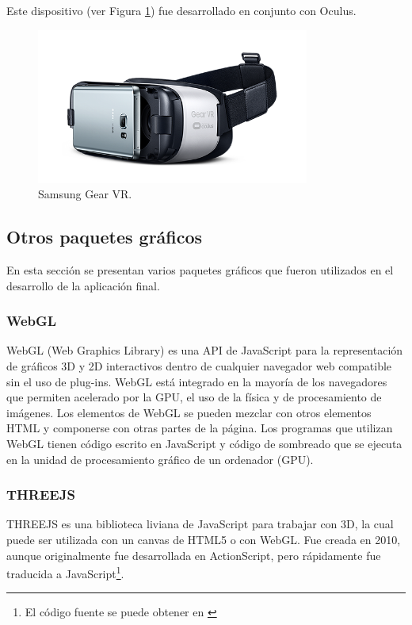 \documentclass[12pt]{article}
\begin{document}
Este dispositivo (ver Figura \ref{sgvr}) fue desarrollado en conjunto con Oculus\cite{samsungvr}.
\begin{figure}[h!]
\includegraphics[width=0.8\textwidth,center]{samsungvr.png}
\caption{Samsung Gear VR.}
\label{sgvr}
\end{figure}

\subsection{Otros paquetes gráficos}
\noindent En esta sección se presentan varios paquetes gráficos que fueron utilizados en el desarrollo de la aplicación final.
\subsubsection{WebGL}
\noindent WebGL (Web Graphics Library) es una API de JavaScript para la representación  de gráficos 3D y 2D  interactivos dentro de cualquier navegador web compatible sin el uso de plug-ins. WebGL está integrado en la mayoría de los navegadores que permiten acelerado por la GPU, el uso de la física y de procesamiento de imágenes. Los elementos de WebGL se pueden mezclar con otros elementos HTML y componerse con otras partes de la página. Los programas que utilizan WebGL tienen código escrito en JavaScript y  código de sombreado que se ejecuta en la unidad de procesamiento gráfico de un ordenador (GPU). 
\subsubsection{THREEJS}
\noindent THREEJS es una biblioteca liviana\cite{three} de JavaScript para trabajar con 3D, la cual puede ser utilizada con un canvas de HTML5 o con WebGL. Fue creada en 2010, aunque originalmente fue desarrollada en ActionScript, pero rápidamente fue traducida a JavaScript\footnote{El código fuente se puede obtener en \cite{codigothree}}.
\end{document}
